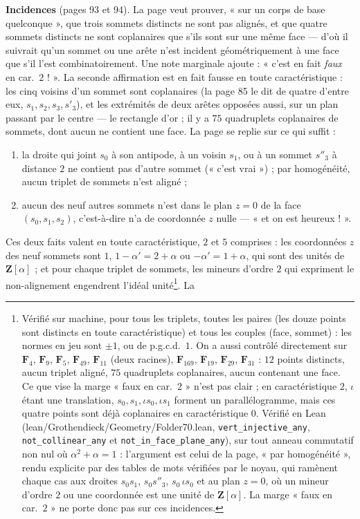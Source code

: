 \documentclass[11pt,a4paper]{article}
\begin{document}
\textbf{Incidences} (pages 93 et 94). La page veut prouver, « sur un corps de
base quelconque », que trois sommets distincts ne sont pas alignés, et que
quatre sommets distincts ne sont coplanaires que s'ils sont sur une même face
--- d'où il suivrait qu'un sommet ou une arête n'est incident géométriquement
à une face que s'il l'est combinatoirement. Une note marginale ajoute :
« c'est en fait \emph{faux} en car.\ $2$ ! ». La seconde affirmation est en
fait fausse en toute caractéristique : les cinq voisins d'un sommet sont
coplanaires (la page 85 le dit de quatre d'entre eux, $s_1, s_2, s_3, s'_3$),
et les extrémités de deux arêtes opposées aussi, sur un plan passant par le
centre --- le rectangle d'or ; il y a $75$ quadruplets coplanaires de sommets,
dont aucun ne contient une face. La page se replie sur ce qui suffit :
\begin{enumerate}
  \item[a)--c)] la droite qui joint $s_0$ à son antipode, à un voisin $s_1$, ou
    à un sommet $s''_3$ à distance $2$ ne contient pas d'autre sommet (« c'est
    vrai ») ; par homogénéité, aucun triplet de sommets n'est aligné ;
  \item aucun des neuf autres sommets n'est dans le plan $z = 0$ de la face
    $(s_0, s_1, s_2)$, c'est-à-dire n'a de coordonnée $z$ nulle --- « et on est
    heureux ! ».
\end{enumerate}
Ces deux faits valent en toute caractéristique, $2$ et $5$ comprises : les
coordonnées $z$ des neuf sommets sont $1$, $1 - \alpha' = 2 + \alpha$ ou
$-\alpha' = 1 + \alpha$, qui sont des unités de $\mathbf{Z}[\alpha]$ ; et pour
chaque triplet de sommets, les mineurs d'ordre $2$ qui expriment le non-alignement
engendrent l'idéal unité\footnote{Vérifié sur machine, pour tous les
triplets, toutes les paires (les douze points sont distincts en toute
caractéristique) et tous les couples (face, sommet) : les normes en jeu sont
$\pm 1$, ou de p.g.c.d.\ $1$. On a aussi contrôlé directement sur
$\mathbf{F}_4$, $\mathbf{F}_9$, $\mathbf{F}_5$, $\mathbf{F}_{49}$, $\mathbf{F}_{11}$
(deux racines), $\mathbf{F}_{169}$, $\mathbf{F}_{19}$, $\mathbf{F}_{29}$,
$\mathbf{F}_{31}$ : $12$ points distincts, aucun triplet aligné, $75$
quadruplets coplanaires, aucun contenant une face. Ce que vise la marge
« faux en car.\ $2$ » n'est pas clair ; en caractéristique $2$, $\iota$ étant
une translation, $s_0, s_1, \iota s_0, \iota s_1$ forment un parallélogramme,
mais ces quatre points sont déjà coplanaires en caractéristique $0$.
Vérifié en Lean (lean/Grothendieck/Geometry/Folder70.lean,
\texttt{vert\_injective\_any}, \texttt{not\_collinear\_any} et
\texttt{not\_in\_face\_plane\_any}), sur tout anneau commutatif non nul où
$\alpha^2 + \alpha = 1$ : l'argument est celui de la page, « par
homogénéité », rendu explicite par des tables de mots vérifiées par le noyau,
qui ramènent chaque cas aux droites $s_0 s_1$, $s_0 s''_3$, $s_0\,\iota s_0$ et
au plan $z = 0$, où un mineur d'ordre $2$ ou une coordonnée est une unité de
$\mathbf{Z}[\alpha]$. La marge « faux en car.\ $2$ » ne porte donc pas sur ces
incidences.}. La
\end{document}

